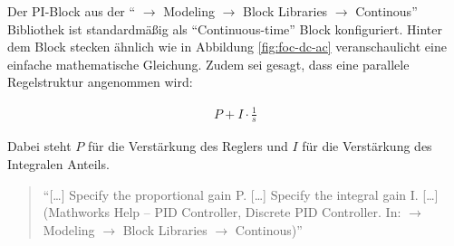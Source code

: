 Der PI-Block aus der \enquote{ $\rightarrow$ Modeling $\rightarrow$ Block Libraries $\rightarrow$ Continous} Bibliothek ist standardmäßig als \enquote{Continuous-time} Block konfiguriert.
Hinter dem Block stecken ähnlich wie in Abbildung \ref{fig:foc-dc-ac} veranschaulicht eine einfache mathematische Gleichung.
Zudem sei gesagt, dass eine parallele Regelstruktur angenommen wird:

\begin{align}
	P + I\cdot\frac{1}{s}
\end{align}

Dabei steht $P$ für die Verstärkung des Reglers und $I$ für die Verstärkung des Integralen Anteils.

\begin{quote}
	\enquote{[\ldots] Specify the proportional gain P. [\ldots] Specify the integral gain I. [\ldots] (Mathworks Help -- PID Controller, Discrete PID Controller. In:  $\rightarrow$ Modeling $\rightarrow$ Block Libraries $\rightarrow$ Continous)}
\end{quote}

